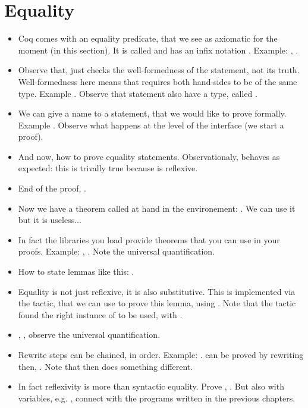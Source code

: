 
\section{Equality}

\begin{itemize}
\item Coq comes with an equality predicate, that we see as axiomatic for the
moment (in this section). It is called  and has an infix
notation \C{=}. Example: , .
\item Observe that,  just checks the well-formedness of the
  statement, not its truth. Well-formedness here means that \C{=}
  requires both hand-sides to be of the same type.
  Example . Observe that statement also have a
  type, called .
\item We can give a name to a statement, that we would like to prove
  formally. Example . Observe what happens at the
  level of the interface (we start a proof).
\item And now, how to prove equality statements. Observationaly, \C{=}
  behaves as expected: this is trivally true because \C{=} is
  reflexive.
\item End of the proof, .
\item Now we have a theorem called  at hand in the
  environement: . We can use it but it is useless...
\item In fact the libraries you load provide theorems that you can use
  in your proofs. Example:  , . Note the
  universal quantification.
\item How to state lemmas like this:
.
\item Equality is not just reflexive, it is also substitutive. This is
  implemented via the  tactic, that we can use to prove
  this lemma, using . Note that the tactic found the right
  instance of  to be used, with .
\item {}, , observe the universal quantification.
\item Rewrite steps can be chained, in order. Example:
. can be proved by rewriting
 then, . Note that  then  does
something different.
\item In fact reflexivity is more than syntactic equality. Prove
, . But also with variables,
e.g. , connect with the programs written in the previous
chapters.


\end{itemize}
